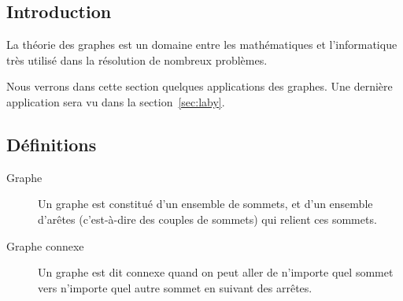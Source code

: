 \subsection{Introduction}
  La théorie des graphes est un domaine entre les mathématiques et
  l'informatique très utilisé dans la résolution de nombreux problèmes.
  
  Nous verrons dans cette section quelques applications des graphes. Une
  dernière application sera vu dans la section~\ref{sec:laby}.

\subsection{Définitions}
  \begin{description}
    \item[Graphe] Un graphe est constitué d'un ensemble de sommets, et d'un
      ensemble d'arêtes (c'est-à-dire des couples de sommets) qui relient ces
      sommets.
      \begin{center}
      \end{center}
    \item[Graphe connexe] Un graphe est dit connexe quand on peut aller de
      n'importe quel sommet vers n'importe quel autre sommet en suivant des
      arrêtes.
      \begin{center}
\end{center}
\end{description}
